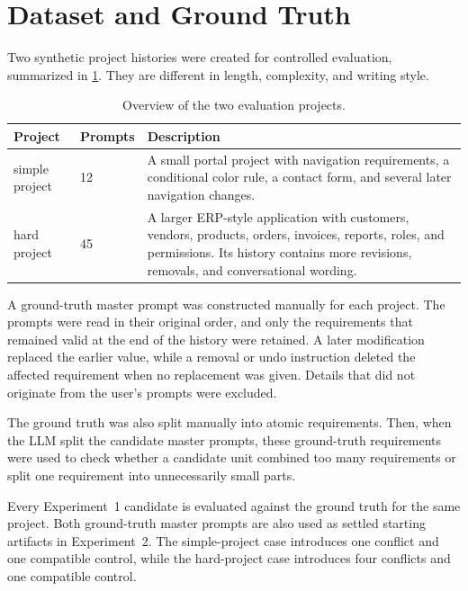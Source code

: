 \section{Dataset and Ground Truth}
\label{sec:method-dataset}

Two synthetic project histories were created for controlled evaluation,
summarized in \cref{tab:dataset-overview}. They are different in length, complexity,
and writing style.

\begin{table}[htbp]
  \centering
  \caption{Overview of the two evaluation projects.}
  \label{tab:dataset-overview}
  \begin{tabular}{@{}llp{9.7cm}@{}}
    \toprule
    Project & Prompts & Description \\
    \midrule
    simple project & 12 & A small portal project with navigation
      requirements, a conditional color rule, a contact form, and several
      later navigation changes. \\
    hard project & 45 & A larger ERP-style application with customers,
      vendors, products, orders, invoices, reports, roles, and permissions.
      Its history contains more revisions, removals, and conversational
      wording. \\
    \bottomrule
  \end{tabular}
\end{table}

A ground-truth master prompt was constructed manually for each project. The
prompts were read in their original order, and only the requirements that
remained valid at the end of the history were retained. A later modification
replaced the earlier value, while a removal or undo instruction deleted the
affected requirement when no replacement was given. Details that did not
originate from the user's prompts were excluded.

The ground truth was also split manually into atomic requirements. Then, when the
LLM split the candidate master prompts, these ground-truth requirements
were used to check whether a candidate unit combined too many requirements or
split one requirement into unnecessarily small parts.

Every Experiment~1 candidate is evaluated against the ground truth for the
same project. Both ground-truth master prompts are also used as settled
starting artifacts in Experiment~2. The simple-project case introduces one
conflict and one compatible control, while the hard-project case introduces
four conflicts and one compatible control.

